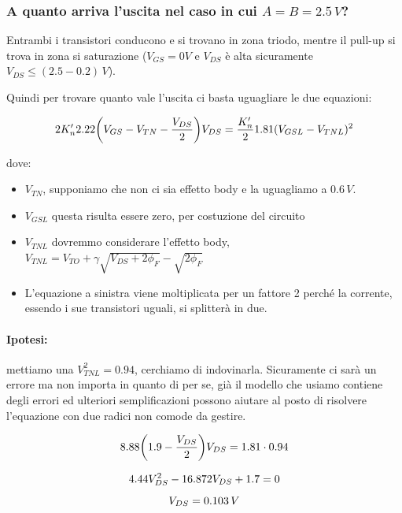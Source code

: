 \subsubsection{A quanto arriva l'uscita nel caso in cui $A = B = 2.5\,V$?}

Entrambi i transistori conducono e si trovano in zona triodo, mentre il pull-up si trova in zona si saturazione ($V_{GS} = 0V$ e $V_{DS}$ è alta sicuramente $V_{DS} \leq (2.5 - 0.2)\,V$).


Quindi per trovare quanto vale l'uscita ci basta uguagliare le due equazioni:

\begin{equation*}
    2K_n'2.22\biggl(V_{GS} - V_{TN} - \frac{V_{DS}}{2}\biggl)V_{DS} = \frac{K_n'}{2}1.81(V_{GSL} - V_{TNL})^2
\end{equation*}

dove:

\begin{itemize}
    \item $V_{TN}$, supponiamo che non ci sia effetto body e la uguagliamo a $0.6\,V$.
    \item $V_{GSL}$ questa risulta essere zero, per costuzione del circuito
    \item $V_{TNL}$ dovremmo considerare l'effetto body, $V_{TNL} = V_{TO} + \gamma\sqrt{V_{DS} + 2\phi_F} - \sqrt{2\phi_F}$
    \item L'equazione a sinistra viene moltiplicata per un fattore 2 perché la corrente, essendo i sue transistori uguali, si splitterà in due.
\end{itemize}

\paragraph{Ipotesi: } mettiamo una $V_{TNL}^2 = 0.94$, cerchiamo di indovinarla. Sicuramente ci sarà un errore ma non importa in quanto di per se, già il modello che usiamo contiene degli errori ed ulteriori semplificazioni possono aiutare al posto di risolvere l'equazione con due radici non comode da gestire.

\begin{equation*}
    8.88\biggl(1.9  - \frac{V_{DS}}{2}\biggl)V_{DS} = 1.81\cdot0.94
\end{equation*}

\begin{equation*}
    4.44V_{DS}^2 - 16.872V_{DS} + 1.7 = 0
\end{equation*}
\begin{equation*}
    V_{DS} = 0.103 \,V
\end{equation*}

